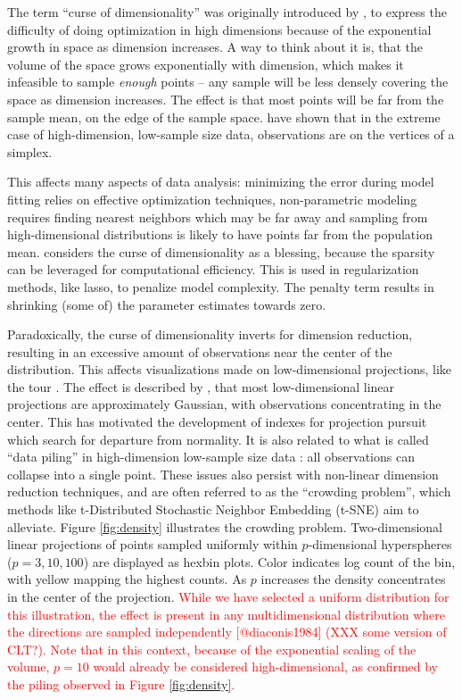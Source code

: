 \documentclass[]{interact}
\theoremstyle{plain}%
\theoremstyle{definition}
\theoremstyle{remark}
\begin{document}
The term ``curse of dimensionality'' was originally introduced by
\citet{BellmanRichard1961}, to express the difficulty of doing
optimization in high dimensions because of the exponential growth in
space as dimension increases. A way to think about it is, that the
volume of the space grows exponentially with dimension, which makes it
infeasible to sample \emph{enough} points -- any sample will be less
densely covering the space as dimension increases. The effect is that
most points will be far from the sample mean, on the edge of the sample
space. \citet{doi:10.1111/j.1467-9868.2005.00510.x} have shown that in
the extreme case of high-dimension, low-sample size data, observations
are on the vertices of a simplex.

This affects many aspects of data analysis: minimizing the error during
model fitting relies on effective optimization techniques,
non-parametric modeling requires finding nearest neighbors which may be
far away and sampling from high-dimensional distributions is likely to
have points far from the population mean. \citet{Donoho00} considers the
curse of dimensionality as a blessing, because the sparsity can be
leveraged for computational efficiency. This is used in regularization
methods, like lasso, to penalize model complexity. The penalty term
results in shrinking (some of) the parameter estimates towards zero.

Paradoxically, the curse of dimensionality inverts for dimension
reduction, resulting in an excessive amount of observations near the
center of the distribution. This affects visualizations made on
low-dimensional projections, like the tour \citep[\citet{BCAH05}]{As85}.
The effect is described by \citet{diaconis1984}, that most
low-dimensional linear projections are approximately Gaussian, with
observations concentrating in the center. This has motivated the
development of indexes for projection pursuit which search for departure
from normality. It is also related to what is called ``data piling'' in
high-dimension low-sample size data
\citep[\citet{10.1093/biomet/asp084}]{10.2307/27639976}: all
observations can collapse into a single point. These issues also persist
with non-linear dimension reduction techniques, and are often referred
to as the ``crowding problem'', which methods like t-Distributed
Stochastic Neighbor Embedding (t-SNE) \citep{tsne} aim to alleviate.
Figure \ref{fig:density} illustrates the crowding problem.
Two-dimensional linear projections of points sampled uniformly within
\(p\)-dimensional hyperspheres (\(p=3, 10, 100\)) are displayed as
hexbin plots. Color indicates log count of the bin, with yellow mapping
the highest counts. As \(p\) increases the density concentrates in the
center of the projection.
\textcolor{red}{While we have selected a uniform distribution for this illustration, the effect is present in any multidimensional distribution where the directions are sampled independently [@diaconis1984] (XXX some version of CLT?). Note that in this context, because of the exponential scaling of the volume, $p=10$ would already be considered high-dimensional, as confirmed by the piling observed in Figure  \ref{fig:density}.}
\end{document}
